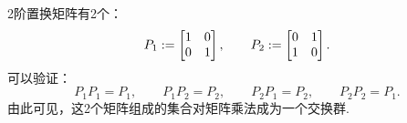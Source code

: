 
\begin{example}
2阶置换矩阵有2个：\begin{equation*}
	P_1 := \begin{bmatrix}
		1 & 0 \\
		0 & 1
	\end{bmatrix},
	\qquad
	P_2 := \begin{bmatrix}
		0 & 1 \\
		1 & 0
	\end{bmatrix}.
\end{equation*}
可以验证：\begin{equation*}
	P_1 P_1 = P_1,
	\qquad
	P_1 P_2 = P_2,
	\qquad
	P_2 P_1 = P_2,
	\qquad
	P_2 P_2 = P_1.
\end{equation*}
由此可见，这2个矩阵组成的集合对矩阵乘法成为一个交换群.
\end{example}

